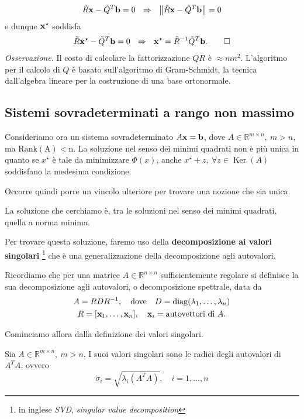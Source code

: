 \begin{equation*}
\tilde{R}\x -\tilde{Q}^{T}\mathbf{b} =0\ \ \Rightarrow \ \ \left\Vert \tilde{R}\x -\tilde{Q}^{T}\mathbf{b}\right\Vert =0
\end{equation*}
e dunque $\mathbf{x}^{\star }$ soddisfa
\begin{gather*}
\tilde{R}\x^{\star } -\tilde{Q}^{T}\mathbf{b} =0\ \ \Rightarrow \ \ \x^{\star } =\tilde{R}^{-1}\tilde{Q}^{T}\mathbf{b}.
\qed
\end{gather*}
\textit{Osservazione.} Il costo di calcolare la fattorizzazione $QR$ è $\approx mn^{2}$. L'algoritmo per il calcolo di $Q$ è basato sull'algoritmo di Gram-Schmidt, la tecnica dall'algebra lineare per la costruzione di una base ortonormale.

\subsection{Sistemi sovradeterminati a rango non massimo}
Consideriamo ora un sistema sovradeterminato $A\mathbf{x} =\mathbf b$, dove $A\in \mathbb{R}^{m\times n},\ m>n$, ma $\operatorname{Rank(A)<n}$. La soluzione nel senso dei minimi quadrati non è più unica in quanto se $x^\star$ è tale da minimizzare $\Phi(x)$, anche $x^\star+z,\ \forall z\in \operatorname{Ker}(A)$ soddisfano la medesima condizione.

Occorre quindi porre un vincolo ulteriore per trovare una nozione che sia unica.

La soluzione che cerchiamo è, tra le soluzioni nel senso dei minimi quadrati, quella a norma minima.

Per trovare questa soluzione, faremo uso della \textbf{decomposizione ai valori singolari} \footnote{in inglese \textit{SVD}, \textit{singular value decomposition}} che è una generalizzazione della decomposizione agli autovalori.

Ricordiamo che per una matrice $A\in \mathbb R^{n\times n}$ sufficientemente regolare si definisce la sua decomposizione agli autovalori, o decomposizione spettrale, data da
\begin{gather*}
    A=RDR^{-1},\quad  \text{dove} \quad D=\operatorname{diag}(\lambda_1,\dots,\lambda_n)\\R=[\mathbf{x}_1,\dots,\mathbf{x}_n], \quad \mathbf{x}_i=\text{autovettori di }A.
\end{gather*}

Cominciamo allora dalla definizione dei valori singolari.

\begin{definition}
    Sia $A\in\mathbb R^{m\times n},\ m>n$. I suoi valori singolari sono le radici degli autovalori di $A^TA$, ovvero
    \[
    \sigma_i=\sqrt{\lambda _i(A^TA)},\quad i=1,\dots,n
    \]
\end{definition}

